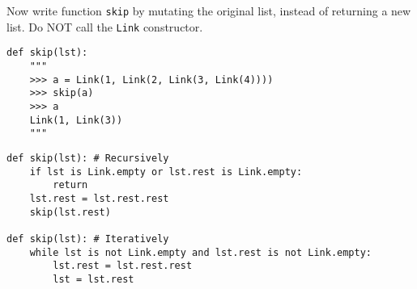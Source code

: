 \begin{blocksection}
\question Now write function \texttt{skip} by mutating the original list, instead of returning a new list. Do NOT call the \texttt{Link} constructor.

\begin{lstlisting}
def skip(lst):
    """
    >>> a = Link(1, Link(2, Link(3, Link(4))))
    >>> skip(a)
    >>> a
    Link(1, Link(3))
    """
\end{lstlisting}

\begin{solution}[1in]
\begin{lstlisting}
def skip(lst): # Recursively
    if lst is Link.empty or lst.rest is Link.empty:
        return
    lst.rest = lst.rest.rest
    skip(lst.rest)

def skip(lst): # Iteratively
    while lst is not Link.empty and lst.rest is not Link.empty:
        lst.rest = lst.rest.rest
        lst = lst.rest
\end{lstlisting}
\end{solution}

\end{blocksection}
